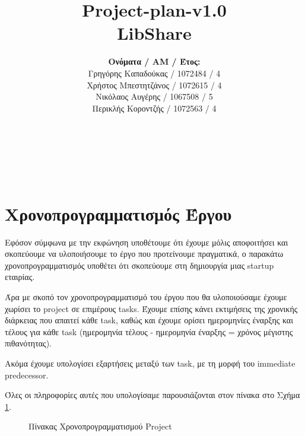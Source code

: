 \documentclass[12pt,a4paper]{article}
\title{Project-plan-v1.0 \\ LibShare}
\author{\textbf{Ονόματα / ΑΜ / Έτος:} \\ Γρηγόρης Καπαδούκας / 1072484 / 4\textdegree \\ Χρήστος Μπεστητζάνος / 1072615 / 4\textdegree \\ Νικόλαος Αυγέρης / 1067508 / 5\textdegree \\ Περικλής Κοροντζής / 1072563 / 4\textdegree}
\begin{document}
\makeatletter
\begin{center}
	\LARGE{\@title} \\
	\pagebreak
    \begin{LARGE}\@author\end{LARGE} \\
\end{center}
\pagebreak

\section{Χρονοπρογραμματισμός Έργου}
Εφόσον σύμφωνα με την εκφώνηση υποθέτουμε ότι έχουμε μόλις αποφοιτήσει και σκοπεύουμε να υλοποιήσουμε το έργο που προτείνουμε πραγματικά, ο παρακάτω χρονοπρογραμματισμός υποθέτει ότι σκοπεύουμε στη δημιουργία μιας startup εταιρίας.

Άρα με σκοπό τον χρονοπρογραμματισμό του έργου που θα υλοποιούσαμε έχουμε χωρίσει το project σε επιμέρους tasks. Έχουμε επίσης κάνει εκτιμήσεις της χρονικής διάρκειας που απαιτεί κάθε task, καθώς και έχουμε ορίσει ημερομηνίες έναρξης και τέλους για κάθε task (ημερομηνία τέλους - ημερομηνία έναρξης = χρόνος μέγιστης πιθανότητας).

Ακόμα έχουμε υπολογίσει εξαρτήσεις μεταξύ των task, με τη μορφή του immediate predecessor.

Όλες οι πληροφορίες αυτές που υπολογίσαμε παρουσιάζονται στον πίνακα στο Σχήμα \ref{Πίνακας Χρονοπρογραμματισμού Project}.

\begin{figure}[H]
	\caption{Πίνακας Χρονοπρογραμματισμού Project}
	\label{Πίνακας Χρονοπρογραμματισμού Project}
\end{figure}
\end{document}
